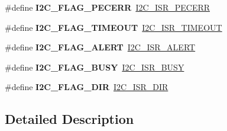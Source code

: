 \begin{DoxyCompactItemize}
\#define {\bfseries I2\+C\+\_\+\+F\+L\+A\+G\+\_\+\+P\+E\+C\+E\+RR}~\mbox{\hyperlink{group___peripheral___registers___bits___definition_ga8b1d42968194fb42f9cc9bb2c2806281}{I2\+C\+\_\+\+I\+S\+R\+\_\+\+P\+E\+C\+E\+RR}}
\item 
\mbox{\label{group___i2_c___flag__definition_ga89c8d5d8ccc77a8619fafe9b39d1cc74}} 
\#define {\bfseries I2\+C\+\_\+\+F\+L\+A\+G\+\_\+\+T\+I\+M\+E\+O\+UT}~\mbox{\hyperlink{group___peripheral___registers___bits___definition_ga63fc8ce165c42d0d719c45e58a82f574}{I2\+C\+\_\+\+I\+S\+R\+\_\+\+T\+I\+M\+E\+O\+UT}}
\item 
\mbox{\label{group___i2_c___flag__definition_gacb0a234f9a7039a764b7d90a10e91dac}} 
\#define {\bfseries I2\+C\+\_\+\+F\+L\+A\+G\+\_\+\+A\+L\+E\+RT}~\mbox{\hyperlink{group___peripheral___registers___bits___definition_ga4c6c779bca999450c595fc797a1fdeec}{I2\+C\+\_\+\+I\+S\+R\+\_\+\+A\+L\+E\+RT}}
\item 
\mbox{\label{group___i2_c___flag__definition_ga50f69f043d99600221076100823b6ff3}} 
\#define {\bfseries I2\+C\+\_\+\+F\+L\+A\+G\+\_\+\+B\+U\+SY}~\mbox{\hyperlink{group___peripheral___registers___bits___definition_ga12ba21dc10ca08a2063a1c4672ffb886}{I2\+C\+\_\+\+I\+S\+R\+\_\+\+B\+U\+SY}}
\item 
\mbox{\label{group___i2_c___flag__definition_ga1db236ae26f1d9bab1dcebc1e62d6bf3}} 
\#define {\bfseries I2\+C\+\_\+\+F\+L\+A\+G\+\_\+\+D\+IR}~\mbox{\hyperlink{group___peripheral___registers___bits___definition_gaa4890d7deb94106f946b28a7309e22aa}{I2\+C\+\_\+\+I\+S\+R\+\_\+\+D\+IR}}
\end{DoxyCompactItemize}


\subsection{Detailed Description}
